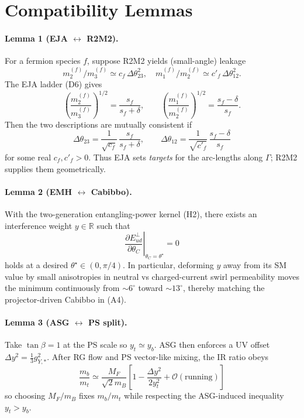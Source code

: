 \section*{Compatibility Lemmas}

\paragraph{Lemma 1 (EJA $\leftrightarrow$ R2M2).} For a fermion species $f$, suppose R2M2 yields (small-angle) leakage
\[
m^{(f)}_2/m^{(f)}_3 \simeq c_f\,\Delta\theta_{23}^2,\quad m^{(f)}_1/m^{(f)}_2 \simeq c'_f\,\Delta\theta_{12}^2.
\]
The EJA ladder (D6) gives
\[
\left(\frac{m^{(f)}_2}{m^{(f)}_3}\right)^{1/2} = \frac{s_f}{s_f+\delta},\qquad \left(\frac{m^{(f)}_1}{m^{(f)}_2}\right)^{1/2} = \frac{s_f-\delta}{s_f}.
\]
Then the two descriptions are mutually consistent if
\begin{equation}
\Delta\theta_{23} = \frac{1}{\sqrt{c_f}}\,\frac{s_f}{s_f+\delta},\qquad \Delta\theta_{12} = \frac{1}{\sqrt{c'_f}}\,\frac{s_f-\delta}{s_f}
\end{equation}
for some real $c_f,c'_f>0$. Thus EJA sets \emph{targets} for the arc-lengths along $\Gamma$; R2M2 supplies them geometrically.

\paragraph{Lemma 2 (EMH $\leftrightarrow$ Cabibbo).} With the two-generation entangling-power kernel (H2), there exists an interference weight $y\in\mathbb{R}$ such that
\[
\left.\frac{\partial E^{\perp}_{ud}}{\partial \theta_C}\right|_{\theta_C=\theta^\star}=0
\]
holds at a desired $\theta^\star\in(0,\pi/4)$. In particular, deforming $y$ away from its SM value by small anisotropies in neutral vs charged-current swirl permeability moves the minimum continuously from $\sim 6^\circ$ toward $\sim 13^\circ$, thereby matching the projector-driven Cabibbo in (A4).

\paragraph{Lemma 3 (ASG $\leftrightarrow$ PS split).} Take $\tan\beta=1$ at the PS scale so $y_t\simeq y_b$. ASG then enforces a UV offset $\Delta y^2 = \tfrac{1}{3} g_{Y,*}^2$. After RG flow and PS vector-like mixing, the IR ratio obeys
\begin{equation}
\frac{m_b}{m_t} \simeq \frac{M_F}{\sqrt{2} m_B}\left[1-\frac{\Delta y^2}{2y_t^2}+\mathcal{O}(\text{running})\right]
\end{equation}
so choosing $M_F/m_B$ fixes $m_b/m_t$ while respecting the ASG-induced inequality $y_t>y_b$.

